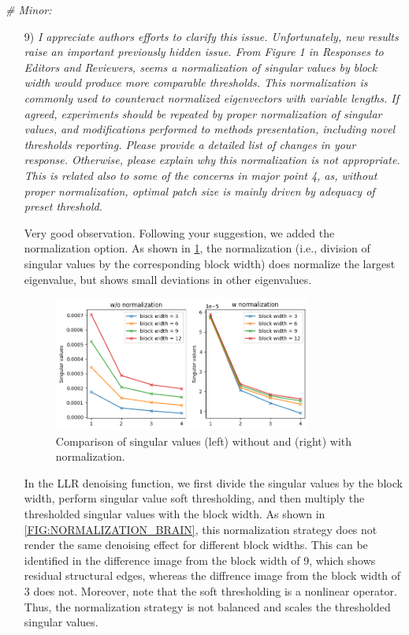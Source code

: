 \documentclass[a4paper,11pt,twoside]{report}
\begin{document}
\noindent \textit{\# Minor:}

\vspace{1em}

\begin{enumerate}
    \item [9)] \textit{I appreciate authors efforts to clarify this issue. Unfortunately, new results raise an important previously hidden issue. From Figure 1 in Responses to Editors and Reviewers, seems a normalization of singular values by block width would produce more comparable thresholds. This normalization is commonly used to counteract normalized eigenvectors with variable lengths. If agreed, experiments should be repeated by proper normalization of singular values, and modifications performed to methods presentation, including novel thresholds reporting. Please provide a detailed list of changes in your response. Otherwise, please explain why this normalization is not appropriate. This is related also to some of the concerns in major point 4, as, without proper normalization, optimal patch size is mainly driven by adequacy of preset threshold.}

    \hspace{1em} {\color{blue} Very good observation.
    Following your suggestion, we added the normalization option.
    As shown in \cref{FIG:NORMALIZATION}, the normalization
    (i.e., division of singular values by the corresponding block width)
    does normalize the largest eigenvalue,
    but shows small deviations in other eigenvalues.

    \begin{figure}
        \centering
        \includegraphics[width=0.8\textwidth]{normalization_llr.png}
        \caption{Comparison of singular values
        (left) without and (right) with normalization.}
        \label{FIG:NORMALIZATION}
    \end{figure}

    \hspace{1em} In the LLR denoising function,
    we first divide the singular values by the block width,
    perform singular value soft thresholding,
    and then multiply the thresholded singular values with the block width.
    As shown in \cref{FIG:NORMALIZATION_BRAIN},
    this normalization strategy does not render the same denoising effect
    for different block widths. This can be identified in the difference image
    from the block width of 9, which shows residual structural edges,
    whereas the diffrence image from the block width of 3 does not.
    Moreover, note that the soft thresholding is
    a nonlinear operator. Thus, the normalization strategy
    is not balanced and scales the thresholded singular values.

}
\end{enumerate}
\end{document}
